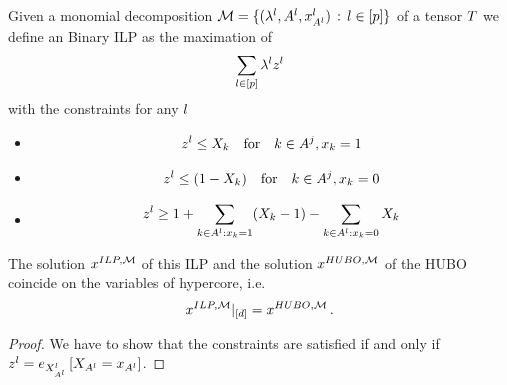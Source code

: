 \begin{theorem}
	Given a monomial decomposition $\mathcal{M}=\{(\lambda^{l}, A^{l}, x_{A^{l}}^{l}) \, : \, l\in[p]\}$ of a tensor $T$ we define an Binary ILP as the maximation of 
	\begin{align*}
		\sum_{l\in[p]} \lambda^{l} z^{l} 
	\end{align*}
	with the constraints for any $l$
	\begin{itemize}
		\item 
		\begin{align*}
			z^{l}  \leq X_{k} \quad \text{for} \quad k\in A^j , x_{k} = 1
		\end{align*}
		\item 
		\begin{align*}
			z^{l}  \leq (1-X_{k}) \quad \text{for} \quad k\in A^j , x_{k} = 0
		\end{align*}
		\item 
		\begin{align*}
			z^{l} \geq 1 + \sum_{k\in A^{l} : x_{k} = 1} (X_{k} -1)
		- \sum_{k\in A^{l} : x_{k} = 0} X_{k} 
		\end{align*}
	\end{itemize}
	The solution $x^{ILP,\mathcal{M}}$ of this ILP and the solution $x^{HUBO,\mathcal{M}}$ of the HUBO coincide on the variables of hypercore, i.e.
		\[ x^{ILP,\mathcal{M}}|_{[d]} =  x^{HUBO,\mathcal{M}} \, . \]
\end{theorem}
\begin{proof}
	We have to show that the constraints are satisfied if and only if $z^{l}=e_{X_{A^{l}}^{l}}\left[X_{A^{l}}=x_{A^{l}}\right]$.
\end{proof}



